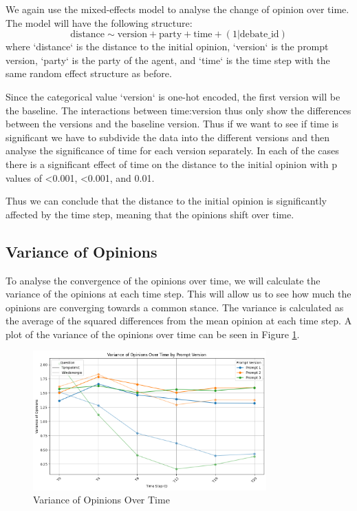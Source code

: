\documentclass[12pt]{article}
\begin{document}
We again use the mixed-effects model to analyse the change of opinion over time. The model will have the following structure:
\begin{equation}
    \text{distance} \sim \text{version} + \text{party}+ \text{time} + (1 | \text{debate\_id})
\end{equation}
where `distance` is the distance to the initial opinion, `version` is the prompt version, `party` is the party of the agent, and `time` is the time step with the same random effect structure as before.

Since the categorical value `version` is one-hot encoded, the first version will be the baseline. The interactions between time:version thus only show the differences between the versions and the baseline version. Thus if we want to see if time is significant we have to subdivide the data into the different versions and then analyse the significance of time for each version separately. In each of the cases there is a significant effect of time on the distance to the initial opinion with p values of \textless 0.001, \textless 0.001, and 0.01.

Thus we can conclude that the distance to the initial opinion is significantly affected by the time step, meaning that the opinions shift over time. 


\subsection{Variance of Opinions}
To analyse the convergence of the opinions over time, we will calculate the variance of the opinions at each time step. This will allow us to see how much the opinions are converging towards a common stance. The variance is calculated as the average of the squared differences from the mean opinion at each time step. A plot of the variance of the opinions over time can be seen in Figure \ref{fig:variance_of_opinions}. 


\begin{figure}
\centering
\includegraphics[width=0.8\textwidth]{img/variance_of_opinions.png}
\caption{Variance of Opinions Over Time}
\label{fig:variance_of_opinions}
\end{figure}
\end{document}

